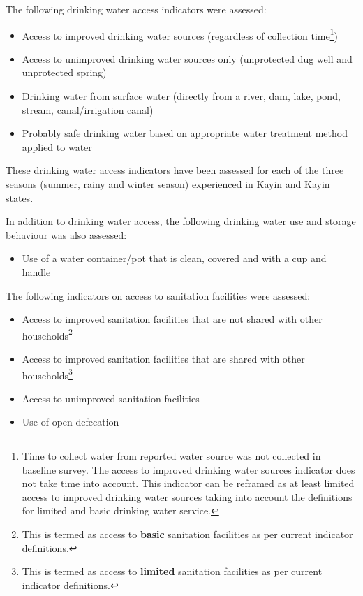 \documentclass[12pt,a4paper]{article}
\providecommand{\tightlist}{%
  \setlength{\itemsep}{0pt}\setlength{\parskip}{0pt}}
\let\rmarkdownfootnote\footnote%
\def\footnote{\protect\rmarkdownfootnote}
\begin{document}
The following drinking water access indicators were assessed:

\begin{itemize}
\item
  Access to improved drinking water sources (regardless of collection time\footnote{Time to collect water from reported water source was not collected in baseline survey. The access to improved drinking water sources indicator does not take time into account. This indicator can be reframed as at least limited access to improved drinking water sources taking into account the definitions for limited and basic drinking water service.})
\item
  Access to unimproved drinking water sources only (unprotected dug well and unprotected spring)
\item
  Drinking water from surface water (directly from a river, dam, lake, pond, stream, canal/irrigation canal)
\item
  Probably safe drinking water based on appropriate water treatment method applied to water
\end{itemize}

These drinking water access indicators have been assessed for each of the three seasons (summer, rainy and winter season) experienced in Kayin and Kayin states.

In addition to drinking water access, the following drinking water use and storage behaviour was also assessed:

\begin{itemize}
\tightlist
\item
  Use of a water container/pot that is clean, covered and with a cup and handle
\end{itemize}

The following indicators on access to sanitation facilities were assessed:

\begin{itemize}
\item
  Access to improved sanitation facilities that are not shared with other households\footnote{This is termed as access to \textbf{basic} sanitation facilities as per current indicator definitions.}
\item
  Access to improved sanitation facilities that are shared with other households\footnote{This is termed as access to \textbf{limited} sanitation facilities as per current indicator definitions.}
\item
  Access to unimproved sanitation facilities
\item
  Use of open defecation
\end{itemize}
\end{document}
